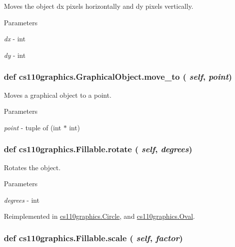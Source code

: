 Moves the object dx pixels horizontally and dy pixels vertically. 
\begin{DoxyParams}{Parameters}
\item[{\em dx}]-\/ int \item[{\em dy}]-\/ int \end{DoxyParams}
\hypertarget{classcs110graphics_1_1GraphicalObject_abe2d480265df7ac9447205c52c6946df}{
\subsubsection[{move\_\-to}]{\setlength{\rightskip}{0pt plus 5cm}def cs110graphics.GraphicalObject.move\_\-to ( {\em self}, \/   {\em point})}}
\label{classcs110graphics_1_1GraphicalObject_abe2d480265df7ac9447205c52c6946df}


Moves a graphical object to a point. 
\begin{DoxyParams}{Parameters}
\item[{\em point}]-\/ tuple of (int $\ast$ int) \end{DoxyParams}
\hypertarget{classcs110graphics_1_1Fillable_afa6710f6c314de39d19f06d9dd306d7d}{
\subsubsection[{rotate}]{\setlength{\rightskip}{0pt plus 5cm}def cs110graphics.Fillable.rotate ( {\em self}, \/   {\em degrees})}}
\label{classcs110graphics_1_1Fillable_afa6710f6c314de39d19f06d9dd306d7d}


Rotates the object. 
\begin{DoxyParams}{Parameters}
\item[{\em degrees}]-\/ int \end{DoxyParams}


Reimplemented in \hyperlink{classcs110graphics_1_1Circle_a0532651c10c084766ac3032c57107eb0}{cs110graphics.Circle}, and \hyperlink{classcs110graphics_1_1Oval_a98bb8103f19d2df5a875db6943fde6e2}{cs110graphics.Oval}.\hypertarget{classcs110graphics_1_1Fillable_a80d5b6b6d2ebae867dccecb803075749}{
\subsubsection[{scale}]{\setlength{\rightskip}{0pt plus 5cm}def cs110graphics.Fillable.scale ( {\em self}, \/   {\em factor})}}
\label{classcs110graphics_1_1Fillable_a80d5b6b6d2ebae867dccecb803075749}


